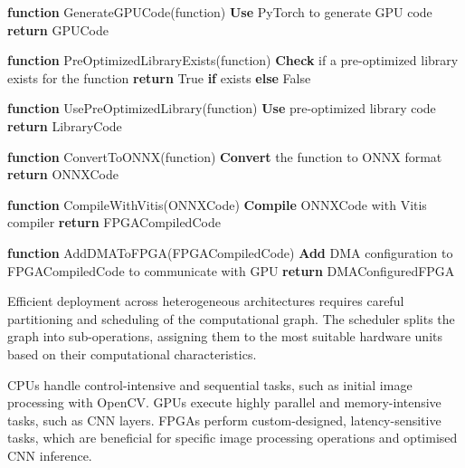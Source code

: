 \documentclass[]{spie}  %
\begin{document}
\begin{algorithm}
\begin{algorithmic}[1]
\STATE \textbf{function} GenerateGPUCode(function)
\STATE \hspace{1em} \textbf{Use} PyTorch to generate GPU code
\STATE \hspace{1em} \textbf{return} GPUCode

\STATE \textbf{function} PreOptimizedLibraryExists(function)
\STATE \hspace{1em} \textbf{Check} if a pre-optimized library exists for the function
\STATE \hspace{1em} \textbf{return} True \textbf{if} exists \textbf{else} False

\STATE \textbf{function} UsePreOptimizedLibrary(function)
\STATE \hspace{1em} \textbf{Use} pre-optimized library code
\STATE \hspace{1em} \textbf{return} LibraryCode

\STATE \textbf{function} ConvertToONNX(function)
\STATE \hspace{1em} \textbf{Convert} the function to ONNX format
\STATE \hspace{1em} \textbf{return} ONNXCode

\STATE \textbf{function} CompileWithVitis(ONNXCode)
\STATE \hspace{1em} \textbf{Compile} ONNXCode with Vitis compiler
\STATE \hspace{1em} \textbf{return} FPGACompiledCode

\STATE \textbf{function} AddDMAToFPGA(FPGACompiledCode)
\STATE \hspace{1em} \textbf{Add} DMA configuration to FPGACompiledCode to communicate with GPU
\STATE \hspace{1em} \textbf{return} DMAConfiguredFPGA

\end{algorithmic}
\end{algorithm}




Efficient deployment across heterogeneous architectures requires careful partitioning and scheduling of the computational graph. The scheduler splits the graph into sub-operations, assigning them to the most suitable hardware units based on their computational characteristics.

CPUs handle control-intensive and sequential tasks, such as initial image processing with OpenCV. GPUs execute highly parallel and memory-intensive tasks, such as CNN layers. FPGAs perform custom-designed, latency-sensitive tasks, which are beneficial for specific image processing operations and optimised CNN inference.
\end{document}
